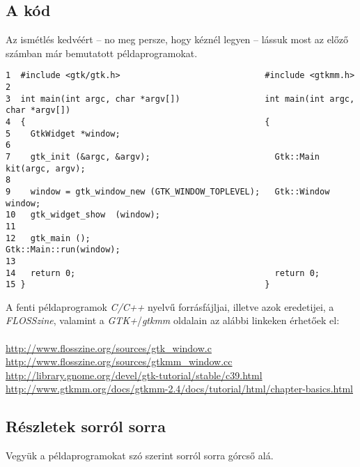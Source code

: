 \subsection{A kód}
\label{sec:gtkminimal}
\label{sec:gtkmmminimal}

Az ismétlés kedvéért -- no meg persze, hogy kéznél legyen -- lássuk most az előző számban már bemutatott példaprogramokat.

\vspace{16pt}
\fontsize{8pt}{8pt}
\begin{verbatim}
1  #include <gtk/gtk.h>                             #include <gtkmm.h>
2
3  int main(int argc, char *argv[])                 int main(int argc, char *argv[])
4  {                                                {
5    GtkWidget *window;
6
7    gtk_init (&argc, &argv);                         Gtk::Main kit(argc, argv);
8
9    window = gtk_window_new (GTK_WINDOW_TOPLEVEL);   Gtk::Window window;
10   gtk_widget_show  (window);
11
12   gtk_main ();                                     Gtk::Main::run(window);
13
14   return 0;                                        return 0;
15 }                                                }
\end{verbatim} 

A fenti példaprogramok \textit{C/C++} nyelvű forrásfájljai, illetve azok eredetijei, a \textit{FLOSSzine}, valamint a \textit{GTK+}/\textit{gtkmm} oldalain az alábbi linkeken érhetőek el:
\ \\\\
\url{http://www.flosszine.org/sources/gtk_window.c}\\
\url{http://www.flosszine.org/sources/gtkmm_window.cc}\\
\url{http://library.gnome.org/devel/gtk-tutorial/stable/c39.html}\\
\url{http://www.gtkmm.org/docs/gtkmm-2.4/docs/tutorial/html/chapter-basics.html}

\subsection{Részletek sorról sorra}

Vegyük a példaprogramokat szó szerint sorról sorra górcső alá.

